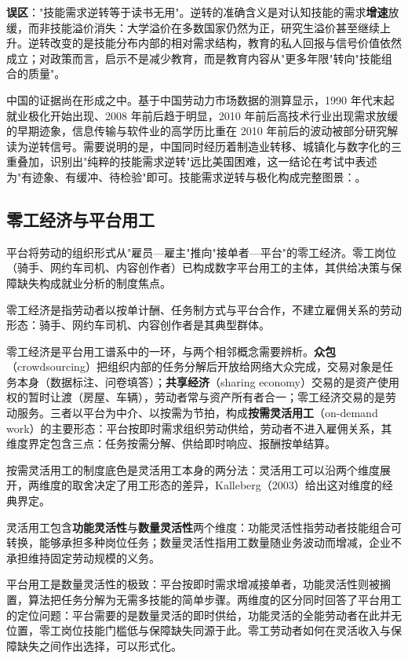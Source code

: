 \begin{misconception}
\textbf{误区}："技能需求逆转等于读书无用"。逆转的准确含义是对认知技能的需求\textbf{增速}放缓，而非技能溢价消失：大学溢价在多数国家仍然为正，研究生溢价甚至继续上升。逆转改变的是技能分布内部的相对需求结构，教育的私人回报与信号价值依然成立；对政策而言，启示不是减少教育，而是教育内容从"更多年限"转向"技能组合的质量"。
\end{misconception}

中国的证据尚在形成之中。基于中国劳动力市场数据的测算显示，1990 年代末起就业极化开始出现、2008 年前后趋于明显，2010 年前后高技术行业出现需求放缓的早期迹象，信息传输与软件业的高学历比重在 2010 年前后的波动被部分研究解读为逆转信号。需要说明的是，中国同时经历着制造业转移、城镇化与数字化的三重叠加，识别出"纯粹的技能需求逆转"远比美国困难，这一结论在考试中表述为"有迹象、有缓冲、待检验"即可。技能需求逆转与极化构成完整图景：。

\subsection{零工经济与平台用工}

平台将劳动的组织形式从"雇员—雇主"推向"接单者—平台"的零工经济。零工岗位（骑手、网约车司机、内容创作者）已构成数字平台用工的主体，其供给决策与保障缺失构成就业分析的制度焦点。

\begin{definition}
零工经济是指劳动者以按单计酬、任务制方式与平台合作，不建立雇佣关系的劳动形态：骑手、网约车司机、内容创作者是其典型群体。
\end{definition}

零工经济是平台用工谱系中的一环，与两个相邻概念需要辨析。\textbf{众包}（crowdsourcing）把组织内部的任务分解后开放给网络大众完成，交易对象是任务本身（数据标注、问卷填答）；\textbf{共享经济}（sharing economy）交易的是资产使用权的暂时让渡（房屋、车辆），劳动者常与资产所有者合一；零工经济交易的是劳动服务。三者以平台为中介、以按需为节拍，构成\textbf{按需灵活用工}（on-demand work）的主要形态：平台按即时需求组织劳动供给，劳动者不进入雇佣关系，其维度界定包含三点：任务按需分解、供给即时响应、报酬按单结算。

按需灵活用工的制度底色是灵活用工本身的两分法：灵活用工可以沿两个维度展开，两维度的取舍决定了用工形态的差异，Kalleberg（2003）给出这对维度的经典界定。\begin{definition}[灵活用工的两维度]
灵活用工包含\textbf{功能灵活性}与\textbf{数量灵活性}两个维度：功能灵活性指劳动者技能组合可转换，能够承担多种岗位任务；数量灵活性指用工数量随业务波动而增减，企业不承担维持固定劳动规模的义务。
\end{definition}
平台用工是数量灵活性的极致：平台按即时需求增减接单者，功能灵活性则被搁置，算法把任务分解为无需多技能的简单步骤。两维度的区分同时回答了平台用工的定位问题：平台需要的是数量灵活的即时供给，功能灵活的全能劳动者在此并无位置，零工岗位技能门槛低与保障缺失同源于此。零工劳动者如何在灵活收入与保障缺失之间作出选择，可以形式化。

